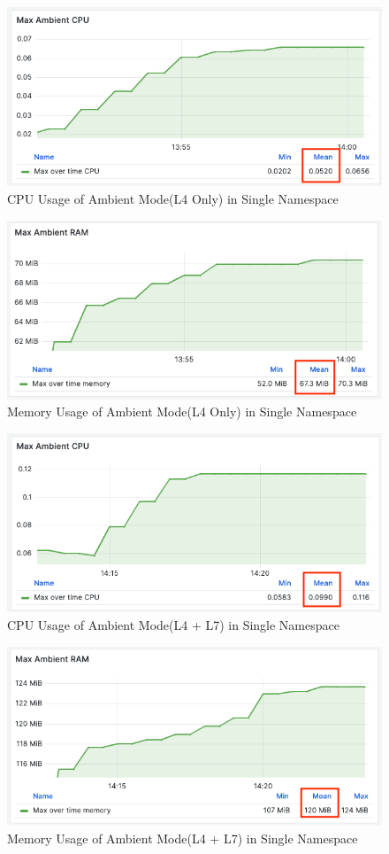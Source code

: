 \begin{figure}[H]
  \centering
  \includegraphics[width=0.8\linewidth]{resources/max-ambient-l4-cpu.png}
  \caption{CPU Usage of Ambient Mode(L4 Only) in Single Namespace}
\end{figure}

\begin{figure}[H]
  \centering
  \includegraphics[width=0.8\linewidth]{resources/max-ambient-l4-mem.png}
  \caption{Memory Usage of Ambient Mode(L4 Only) in Single Namespace}
\end{figure}

\begin{figure}[H]
  \centering
  \includegraphics[width=0.78\linewidth]{resources/max-ambient-l4-l7-cpu.png}
  \caption{CPU Usage of Ambient Mode(L4 + L7) in Single Namespace}
\end{figure}

\begin{figure}[H]
  \centering
  \includegraphics[width=0.8\linewidth]{resources/max-ambient-l4-l7-mem.png}
  \caption{Memory Usage of Ambient Mode(L4 + L7) in Single Namespace}
\end{figure}



